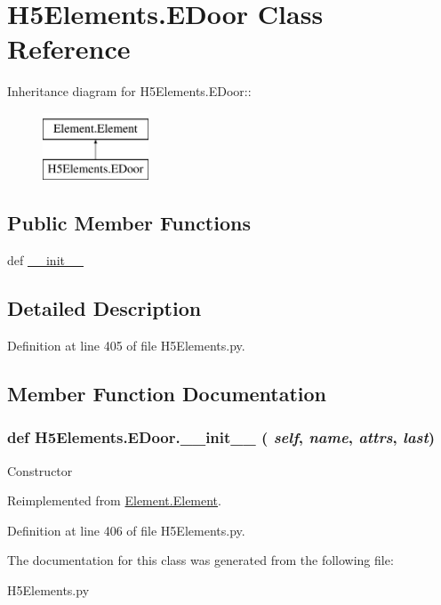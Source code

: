 \hypertarget{classH5Elements_1_1EDoor}{
\section{H5Elements.EDoor Class Reference}
\label{classH5Elements_1_1EDoor}
}
Inheritance diagram for H5Elements.EDoor::\begin{figure}[H]
\begin{center}
\leavevmode
\includegraphics[height=2cm]{classH5Elements_1_1EDoor}
\end{center}
\end{figure}
\subsection*{Public Member Functions}
\begin{DoxyCompactItemize}
\item 
def \hyperlink{classH5Elements_1_1EDoor_ae4bda86f18b9555bc435883e109415a9}{\_\-\_\-init\_\-\_\-}
\end{DoxyCompactItemize}


\subsection{Detailed Description}


Definition at line 405 of file H5Elements.py.

\subsection{Member Function Documentation}
\hypertarget{classH5Elements_1_1EDoor_ae4bda86f18b9555bc435883e109415a9}{
\subsubsection[{\_\-\_\-init\_\-\_\-}]{\setlength{\rightskip}{0pt plus 5cm}def H5Elements.EDoor.\_\-\_\-init\_\-\_\- ( {\em self}, \/   {\em name}, \/   {\em attrs}, \/   {\em last})}}
\label{classH5Elements_1_1EDoor_ae4bda86f18b9555bc435883e109415a9}
\begin{DoxyVerb}Constructor \end{DoxyVerb}
 

Reimplemented from \hyperlink{classElement_1_1Element_a359371465b7c4d21611adec7e86c3b33}{Element.Element}.

Definition at line 406 of file H5Elements.py.

The documentation for this class was generated from the following file:\begin{DoxyCompactItemize}
\item 
H5Elements.py\end{DoxyCompactItemize}
